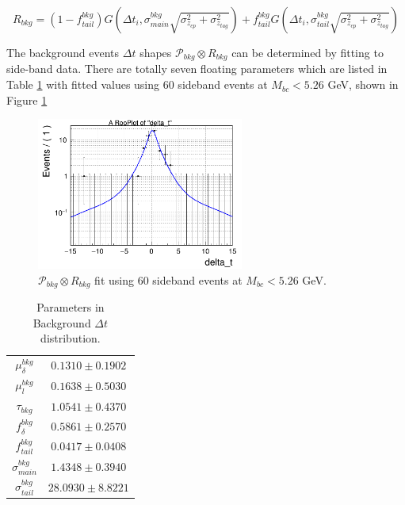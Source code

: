 \begin{equation}\label{eq:Rbkg}
R_{bkg} = (1-f^{bkg}_{tail})G(\Delta t_i, \sigma^{bkg}_{main}\sqrt{\sigma^2_{z_{cp}}+\sigma^2_{z_{tag}}})
+ f^{bkg}_{tail}G(\Delta t_i, \sigma^{bkg}_{tail}\sqrt{\sigma^2_{z_{cp}}+\sigma^2_{z_{tag}}})
\end{equation}

The background events $\Delta t$ shapes $\mathcal{P}_{bkg}\otimes R_{bkg}$ can be determined by fitting to side-band data. There are totally seven floating parameters which are listed in Table  \ref{tab:Pbkg} with fitted values using 60 sideband events at $M_{bc} < 5.26$ GeV, shown in Figure \ref{fig:Pbkg}

\begin{figure}[htpb]
	\centering
	\includegraphics[height=5cm]{figures/bkg-cpfit-data-mbc526}
	\caption{$\mathcal{P}_{bkg}\otimes R_{bkg}$ fit  using 60 sideband events at $M_{bc} < 5.26$ GeV.}
	\label{fig:Pbkg}
\end{figure}
\begin{table}[H]
	\centering
	\begin{tabular}{|c|c|}
		\hline
		$\mu^{bkg}_{\delta}$ & $0.1310 \pm 0.1902$\\
		$\mu^{bkg}_{l}$&  $0.1638 \pm 0.5030$ \\
		$\tau_{bkg}$ & $1.0541\pm 0.4370$\\
		$f_{\delta}^{bkg}$ &  $0.5861\pm 0.2570$\\
		$f^{bkg}_{tail}$  & $0.0417\pm 0.0408$ \\
		$\sigma^{bkg}_{main}$ & $1.4348\pm 0.3940$\\
		$\sigma^{bkg}_{tail}$ & $28.0930 \pm 8.8221$\\
		\hline
	\end{tabular}
	\caption{Parameters in Background $\Delta t$ distribution. }
	\label{tab:Pbkg}
\end{table}


